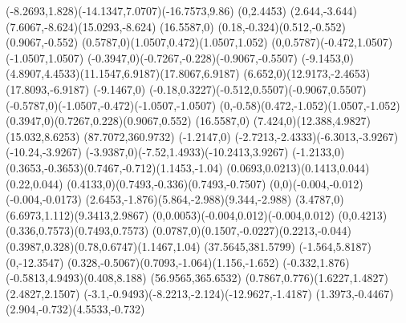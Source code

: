 {    \rcurveto(-8.2693,1.828)(-14.1347,7.0707)(-16.7573,9.86)
    \rlineto(0,2.4453)
    \rcurveto(2.644,-3.644)(7.6067,-8.624)(15.0293,-8.624)
    \rlineto(16.5587,0)
    \rcurveto(0.18,-0.324)(0.512,-0.552)(0.9067,-0.552)
    \rcurveto(0.5787,0)(1.0507,0.472)(1.0507,1.052)
    \rcurveto(0,0.5787)(-0.472,1.0507)(-1.0507,1.0507)
    \rcurveto(-0.3947,0)(-0.7267,-0.228)(-0.9067,-0.5507)
    \rlineto(-9.1453,0)
    \rcurveto(4.8907,4.4533)(11.1547,6.9187)(17.8067,6.9187)
    \rcurveto(6.652,0)(12.9173,-2.4653)(17.8093,-6.9187)
    \rlineto(-9.1467,0)
    \rcurveto(-0.18,0.3227)(-0.512,0.5507)(-0.9067,0.5507)
    \rcurveto(-0.5787,0)(-1.0507,-0.472)(-1.0507,-1.0507)
    \rcurveto(0,-0.58)(0.472,-1.052)(1.0507,-1.052)
    \rcurveto(0.3947,0)(0.7267,0.228)(0.9067,0.552)
    \rlineto(16.5587,0)
    \rcurveto(7.424,0)(12.388,4.9827)(15.032,8.6253)
    \moveto(87.7072,360.9732)
    \rlineto(-1.2147,0)
    \rcurveto(-2.7213,-2.4333)(-6.3013,-3.9267)(-10.24,-3.9267)
    \rcurveto(-3.9387,0)(-7.52,1.4933)(-10.2413,3.9267)
    \rlineto(-1.2133,0)
    \rcurveto(0.3653,-0.3653)(0.7467,-0.712)(1.1453,-1.04)
    \rcurveto(0.0693,0.0213)(0.1413,0.044)(0.22,0.044)
    \rcurveto(0.4133,0)(0.7493,-0.336)(0.7493,-0.7507)
    \rcurveto(0,0)(-0.004,-0.012)(-0.004,-0.0173)
    \rcurveto(2.6453,-1.876)(5.864,-2.988)(9.344,-2.988)
    \rcurveto(3.4787,0)(6.6973,1.112)(9.3413,2.9867)
    \rcurveto(0,0.0053)(-0.004,0.012)(-0.004,0.012)
    \rcurveto(0,0.4213)(0.336,0.7573)(0.7493,0.7573)
    \rcurveto(0.0787,0)(0.1507,-0.0227)(0.2213,-0.044)
    \rcurveto(0.3987,0.328)(0.78,0.6747)(1.1467,1.04)
    \moveto(37.5645,381.5799)
    \rlineto(-1.564,5.8187)
    \rlineto(0,-12.3547)
    \rcurveto(0.328,-0.5067)(0.7093,-1.064)(1.156,-1.652)
    \rcurveto(-0.332,1.876)(-0.5813,4.9493)(0.408,8.188)
    \moveto(56.9565,365.6532)
    \rcurveto(0.7867,0.776)(1.6227,1.4827)(2.4827,2.1507)
    \rcurveto(-3.1,-0.9493)(-8.2213,-2.124)(-12.9627,-1.4187)
    \rcurveto(1.3973,-0.4467)(2.904,-0.732)(4.5533,-0.732)
    \closepath
}
